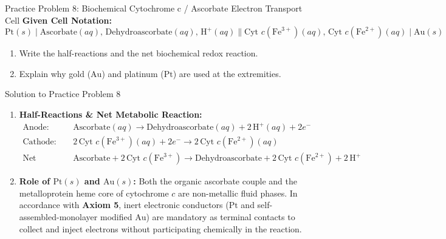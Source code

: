 \documentclass[10pt,a4paper]{article}
\begin{document}
\begin{exercisebox}{Practice Problem 8: Biochemical Cytochrome c / Ascorbate Electron Transport Cell}
\textbf{Given Cell Notation:}
\begin{equation*}
    \text{Pt}(s) \mid \text{Ascorbate}(aq),\, \text{Dehydroascorbate}(aq),\, \text{H}^+(aq) \parallel \text{Cyt } c(\text{Fe}^{3+})(aq),\, \text{Cyt } c(\text{Fe}^{2+})(aq) \mid \text{Au}(s)
\end{equation*}
\begin{enumerate}[label=(\alph*)]
    \item Write the half-reactions and the net biochemical redox reaction.
    \item Explain why gold ($\text{Au}$) and platinum ($\text{Pt}$) are used at the extremities.
\end{enumerate}
\end{exercisebox}

\begin{solutionbox}{Solution to Practice Problem 8}
\begin{enumerate}[label=(\alph*)]
    \item \textbf{Half-Reactions \& Net Metabolic Reaction:}
    \begin{align*}
        \text{Anode:} \quad & \text{Ascorbate}(aq) \longrightarrow \text{Dehydroascorbate}(aq) + 2\,\text{H}^+(aq) + 2e^- \\
        \text{Cathode:} \quad & 2\,\text{Cyt } c(\text{Fe}^{3+})(aq) + 2e^- \longrightarrow 2\,\text{Cyt } c(\text{Fe}^{2+})(aq) \\
        \text{Net Reaction:} \quad & \text{Ascorbate} + 2\,\text{Cyt } c(\text{Fe}^{3+}) \longrightarrow \text{Dehydroascorbate} + 2\,\text{Cyt } c(\text{Fe}^{2+}) + 2\,\text{H}^+
    \end{align*}
    \item \textbf{Role of $\text{Pt}(s)$ and $\text{Au}(s)$:} Both the organic ascorbate couple and the metalloprotein heme core of cytochrome $c$ are non-metallic fluid phases. In accordance with \textbf{Axiom 5}, inert electronic conductors ($\text{Pt}$ and self-assembled-monolayer modified $\text{Au}$) are mandatory as terminal contacts to collect and inject electrons without participating chemically in the reaction.
\end{enumerate}
\end{solutionbox}
\end{document}
